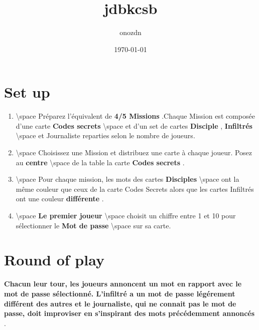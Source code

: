 \documentclass{article}%
\title{jdbkcsb}%
\author{onozdn}%
\date{\today}%
\begin{document}
%
\pagestyle{empty}%
\normalsize%
\maketitle%
\section{ Set up
}%
\label{sec:Setup}%
\begin{enumerate}%
\item%
%
\textbackslash{}space%
 Préparez l'équivalent de %
\textbf{4/5 Missions}%
.Chaque Mission est composée d'une carte %
\textbf{Codes secrets}%
\textbackslash{}space%
 et d'un set de cartes %
\textbf{Disciple}%
,%
\textbf{ Infiltrés}%
\textbackslash{}space%
 et Journaliste reparties selon le nombre de joueurs.
%
\item%
%
\textbackslash{}space%
 Choisissez une Mission et distribuez une carte à chaque joueur. Posez au %
\textbf{centre}%
\textbackslash{}space%
 de la table la carte %
\textbf{Codes secrets}%
.
%
\item%
%
\textbackslash{}space%
 Pour chaque mission, les mots des cartes %
\textbf{Disciples}%
\textbackslash{}space%
 ont la même couleur que ceux de la carte Codes Secrets alors que les cartes Infiltrés ont une couleur %
\textbf{différente}%
.
%
\item%
%
\textbackslash{}space%
\textbf{Le premier joueur}%
\textbackslash{}space%
 choisit un chiffre entre 1 et 10 pour sélectionner le %
\textbf{Mot de passe}%
\textbackslash{}space%
 sur sa carte.
%
\end{enumerate}

%
\section{ Round of play
}%
\label{sec:Roundofplay}%
\textbf{Chacun leur tour, les joueurs annoncent un mot en rapport avec le mot de passe sélectionné. L'infiltré a un mot de passe légérement différent des autres et le journaliste, qui ne connait pas le mot de passe, doit improviser en s'inspirant des mots précédemment annoncés}%
.


%
\end{document}
